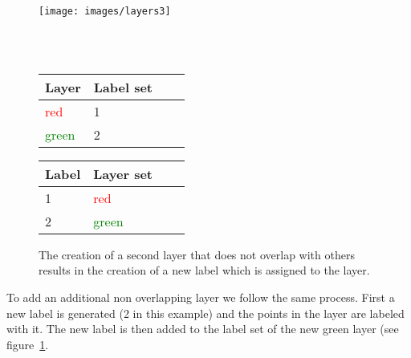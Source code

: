 \begin{figure}[ht]
	\begin{minipage}[b]{\linewidth}
		\centering
		\texttt{[image: images/layers3]}
	\end{minipage}
	\\\\
	\begin{minipage}[b]{0.49\linewidth}
		\hfill
		\begin{tabular}[b]{|l|l|l|l|}
			\hline
			Layer & Label set \\
			\hline
			\textcolor{red}{red}       & 1 \\
			\textcolor{green}{green}       & 2 \\
			\hline
		\end{tabular}
	\end{minipage}
	\hspace{0.5cm}
	\begin{minipage}[b]{0.5\linewidth}
		\begin{tabular}[b]{|l|l|l|l|}
			\hline
			Label & Layer set \\
			\hline
			1       & \textcolor{red}{red} \\
			2       & \textcolor{green}{green} \\
			\hline
		\end{tabular}
		\hfill
	\end{minipage}
	\caption[Two non overlapping layers]{ The creation of a second layer that does not overlap with others results in the creation of a new label which is assigned to the layer. \label{fig:3-layer3}}
\end{figure}

To add an additional non overlapping layer we follow the same process. First a new label is generated (2 in this example) and the points in the layer are labeled with it. The new label is then added to the label set of the new green layer (see figure~\ref{fig:3-layer3}.



